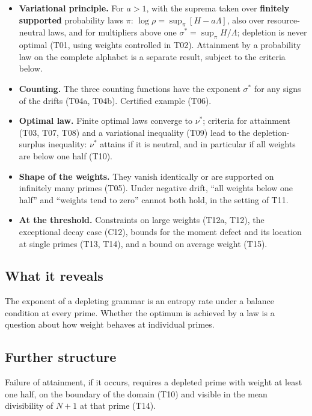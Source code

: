 \documentclass[
  11pt,
]{article}
\providecommand{\tightlist}{%
  \setlength{\itemsep}{0pt}\setlength{\parskip}{0pt}}
\begin{document}
\begin{itemize}
\tightlist
\item
  \textbf{Variational principle.} For \(a>1\), with the suprema taken
  over \textbf{finitely supported} probability laws \(\pi\):
  \(\log\rho=\sup_\pi[H-a\Lambda]\), also over resource-neutral laws,
  and for multipliers above one \(\sigma^\ast=\sup_\pi H/\Lambda\);
  depletion is never optimal (T01, using weights controlled in T02).
  Attainment by a probability law on the complete alphabet is a separate
  result, subject to the criteria below.
\item
  \textbf{Counting.} The three counting functions have the exponent
  \(\sigma^\ast\) for any signs of the drifts (T04a, T04b). Certified
  example (T06).
\item
  \textbf{Optimal law.} Finite optimal laws converge to \(\nu^\ast\);
  criteria for attainment (T03, T07, T08) and a variational inequality
  (T09) lead to the depletion-surplus inequality: \(\nu^\ast\) attains
  if it is neutral, and in particular if all weights are below one half
  (T10).
\item
  \textbf{Shape of the weights.} They vanish identically or are
  supported on infinitely many primes (T05). Under negative drift, ``all
  weights below one half'' and ``weights tend to zero'' cannot both
  hold, in the setting of T11.
\item
  \textbf{At the threshold.} Constraints on large weights (T12a, T12),
  the exceptional decay case (C12), bounds for the moment defect and its
  location at single primes (T13, T14), and a bound on average weight
  (T15).
\end{itemize}

\hypertarget{what-it-reveals-10}{%
\subsection{What it reveals}\label{what-it-reveals-10}}

The exponent of a depleting grammar is an entropy rate under a balance
condition at every prime. Whether the optimum is achieved by a law is a
question about how weight behaves at individual primes.

\hypertarget{further-structure-10}{%
\subsection{Further structure}\label{further-structure-10}}

Failure of attainment, if it occurs, requires a depleted prime with
weight at least one half, on the boundary of the domain (T10) and
visible in the mean divisibility of \(N+1\) at that prime (T14).
\end{document}
